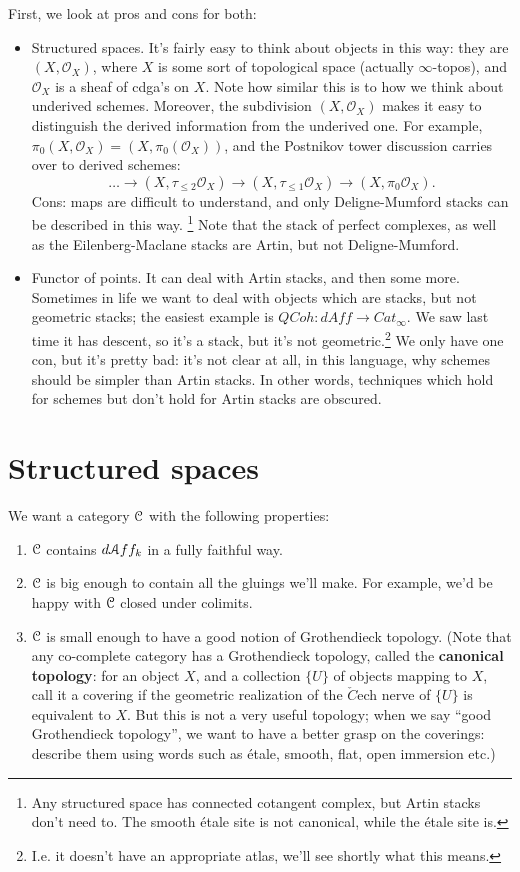 First, we look at pros and cons for both:
\begin{itemize}
\item Structured spaces. It's fairly easy to think about objects in this way: they are $(X, \mathcal{O}_X)$, where $X$ is some
sort of topological space (actually $\infty$-topos), and $\mathcal{O}_X$ is a sheaf of cdga's on $X$. Note how similar this is
to how we think about underived schemes. Moreover, the subdivision $(X, \mathcal{O}_X)$ makes it easy to distinguish the
derived information from the underived one. For example, $\pi_0(X,\mathcal{O}_X) = (X, \pi_0(\mathcal{O}_X))$, and the Postnikov
tower discussion carries over to derived schemes:
\[	\dots \to (X, \tau_{\leq 2} \mathcal{O}_X) \to (X, \tau_{\leq 1} \mathcal{O}_X) \to (X, \pi_0 \mathcal{O}_X).	\]
Cons: maps are difficult to understand, and only Deligne-Mumford stacks can be described in this way. 
\footnote{Any structured space has connected cotangent complex, but Artin stacks don't need to. The smooth \'etale
site is not canonical, while the \'etale site is.}
Note that the stack of
perfect complexes, as well as the Eilenberg-Maclane stacks are Artin, but not Deligne-Mumford.

\item Functor of points. It can deal with Artin stacks, and then some more. Sometimes in life we want to deal with objects 
which are stacks,
but not geometric stacks; the easiest example is $QCoh : d Aff \to Cat_{\infty}$. We saw last time it has descent, so it's
a stack, but it's not geometric.\footnote{I.e. it doesn't have an appropriate atlas, we'll see shortly what this means.} 
We only have one con, but it's pretty bad: it's not clear at all,
in this language, why schemes should be simpler than Artin stacks. In other words, techniques which hold for schemes but don't
hold for Artin stacks are obscured.
\end{itemize}


\section{Structured spaces}
We want a category $\mathcal C$ with the following properties:
\begin{enumerate}
\item \label{env1}
$\mathcal C$ contains $d \mathcal A ff_k$ in a fully faithful way.
\item \label{env2}
$\mathcal C$ is big enough to contain all the gluings we'll make. For example, we'd be happy with $\mathcal C$ closed under colimits.
\item \label{env3}
$\mathcal C$ is small enough to have a good notion of Grothendieck topology. (Note that any co-complete category has a Grothendieck
topology, called the \textbf{canonical topology}: for an object $X$, and a collection $\{U\}$ of objects mapping to $X$, 
call it a covering if
the geometric realization of the $\check{C}$ech nerve of $\{U\}$ is equivalent to $X$. But this is not a very useful topology; when
we say ``good Grothendieck topology'', we want to have a better grasp on the coverings: describe them using words such as
\'etale, smooth, flat, open immersion etc.)
\end{enumerate}


